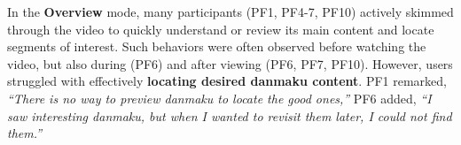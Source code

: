 



In the \textbf{Overview} mode, many participants (PF1, PF4-7, PF10) actively skimmed through the video to quickly understand or review its main content and locate segments of interest. Such behaviors were often observed before watching the video, but also during (PF6) and after viewing (PF6, PF7, PF10). However, users struggled with effectively \textbf{locating desired danmaku content}. PF1 remarked, \textit{``There is no way to preview danmaku to locate the good ones,''} PF6 added, \textit{``I saw interesting danmaku, but when I wanted to revisit them later, I could not find them.''}

